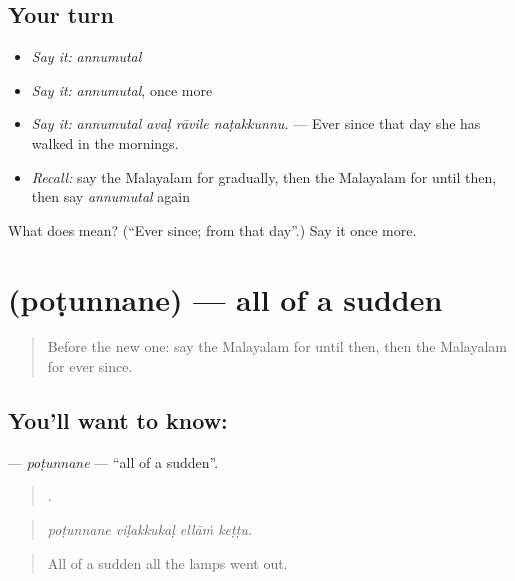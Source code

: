 \subsection*{Your turn}
\begin{itemize}
\raggedright
  \item \emph{Say it:} \emph{annumutal}
  \item \emph{Say it:} \emph{annumutal}, once more
  \item \emph{Say it:} \emph{annumutal avaḷ rāvile naṭakkunnu.} — Ever since that day she has walked in the mornings.
  \item \emph{Recall:} say the Malayalam for gradually, then the Malayalam for until then, then say \emph{annumutal} again
\end{itemize}

\begin{tcolorbox}[breakable,colback=teal!4,colframe=teal!35!black,title={Before you move on}]
What does  mean? (\textquotedblleft{}Ever since; from that day\textquotedblright{}.) Say it once more.
\end{tcolorbox}
\section[\texorpdfstring{\ml{പൊടുന്നനെ} (poṭunnane)}{പൊടുന്നനെ (poṭunnane)}]{ (poṭunnane) — all of a sudden}

\label{lesson:ML-C357-potunnane}



\begin{quote}
Before the new one: say the Malayalam for until then, then the Malayalam for ever since.
\end{quote}

\subsection*{You'll want to know: }
\textbf{} — \emph{poṭunnane} — \textquotedblleft{}all of a sudden\textquotedblright{}.

\begin{quote}
   .
\end{quote}

\begin{quote}
\emph{poṭunnane viḷakkukaḷ ellāṁ keṭṭu.}
\end{quote}

\begin{quote}
All of a sudden all the lamps went out.
\end{quote}

